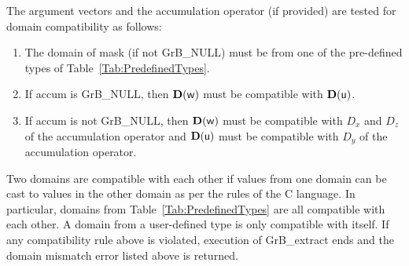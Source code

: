 The argument vectors and the accumulation 
operator (if provided) are tested for domain compatibility as follows:
\begin{enumerate}
	\item The domain of {\sf mask} (if not {\sf GrB\_NULL}) must be from one of 
    the pre-defined types of Table~\ref{Tab:PredefinedTypes}.

	\item If {\sf accum} is {\sf GrB\_NULL}, then $\bold{D}({\sf w})$ must be 
    compatible with $\bold{D}({\sf u})$.

	\item If {\sf accum} is not {\sf GrB\_NULL}, then $\bold{D}({\sf w})$ must be
    compatible with $D_x$ and $D_z$ of the accumulation operator and 
    $\bold{D}({\sf u})$ must be compatible with $D_y$ of the accumulation operator.
\end{enumerate}
Two domains are compatible with each other if values from one domain can be cast 
to values in the other domain as per the rules of the C language.
In particular, domains from Table~\ref{Tab:PredefinedTypes} are all compatible 
with each other. A domain from a user-defined type is only compatible with itself.
If any compatibility rule above is violated, execution of {\sf GrB\_extract} ends
and the domain mismatch error listed above is returned.

